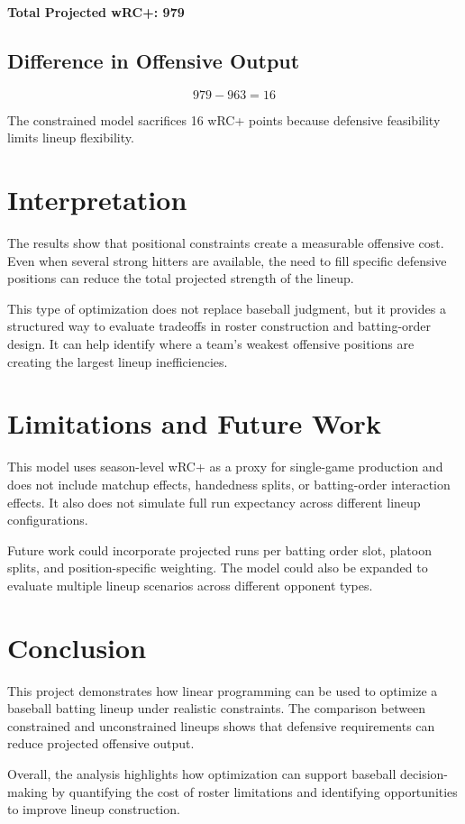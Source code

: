 \documentclass[12pt]{article}
\begin{document}
\textbf{Total Projected wRC+: 979}

\subsection*{Difference in Offensive Output}

\[
979 - 963 = 16
\]

The constrained model sacrifices 16 wRC+ points because defensive feasibility limits lineup flexibility.

\section{Interpretation}

The results show that positional constraints create a measurable offensive cost. Even when several strong hitters are available, the need to fill specific defensive positions can reduce the total projected strength of the lineup.

This type of optimization does not replace baseball judgment, but it provides a structured way to evaluate tradeoffs in roster construction and batting-order design. It can help identify where a team’s weakest offensive positions are creating the largest lineup inefficiencies.

\section{Limitations and Future Work}

This model uses season-level wRC+ as a proxy for single-game production and does not include matchup effects, handedness splits, or batting-order interaction effects. It also does not simulate full run expectancy across different lineup configurations.

Future work could incorporate projected runs per batting order slot, platoon splits, and position-specific weighting. The model could also be expanded to evaluate multiple lineup scenarios across different opponent types.

\section{Conclusion}

This project demonstrates how linear programming can be used to optimize a baseball batting lineup under realistic constraints. The comparison between constrained and unconstrained lineups shows that defensive requirements can reduce projected offensive output.

Overall, the analysis highlights how optimization can support baseball decision-making by quantifying the cost of roster limitations and identifying opportunities to improve lineup construction.
\end{document}

